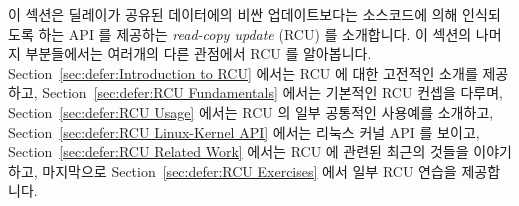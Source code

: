 이 섹션은 딜레이가 공유된 데이터에의 비싼 업데이트보다는 소스코드에 의해
인식되도록 하는 API 를 제공하는 \emph{read-copy update} (RCU) 를 소개합니다.
이 섹션의 나머지 부분들에서는 여러개의 다른 관점에서 RCU 를 알아봅니다.
Section~\ref{sec:defer:Introduction to RCU} 에서는 RCU 에 대한 고전적인 소개를
제공하고,
Section~\ref{sec:defer:RCU Fundamentals} 에서는 기본적인 RCU 컨셉을 다루며,
Section~\ref{sec:defer:RCU Usage} 에서는 RCU 의 일부 공통적인 사용예를
소개하고,
Section~\ref{sec:defer:RCU Linux-Kernel API} 에서는 리눅스 커널 API 를 보이고,
Section~\ref{sec:defer:RCU Related Work} 에서는 RCU 에 관련된 최근의 것들을
이야기하고, 마지막으로
Section~\ref{sec:defer:RCU Exercises} 에서 일부 RCU 연습을 제공합니다.
\iffalse


This section introduces \emph{read-copy update} (RCU), which provides
an API that allows delays to be identified in the source code,
rather than as expensive updates to shared data.
The remainder of this
section examines RCU from a number of different perspectives.
Section~\ref{sec:defer:Introduction to RCU} provides the classic
introduction to RCU,
Section~\ref{sec:defer:RCU Fundamentals} covers fundamental RCU
concepts,
Section~\ref{sec:defer:RCU Usage} introduces some common uses of RCU,
Section~\ref{sec:defer:RCU Linux-Kernel API} presents the Linux-kernel
API,
Section~\ref{sec:defer:RCU Related Work} covers recent work related
to RCU,
and finally
Section~\ref{sec:defer:RCU Exercises} provides some RCU exercises.
\fi







